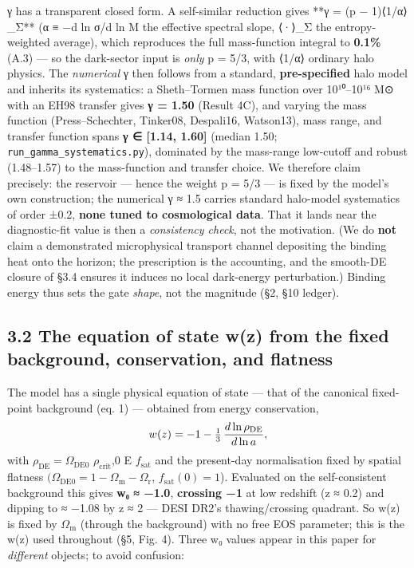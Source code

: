 \documentclass[
  10pt,
]{article}
\begin{document}
γ has a transparent closed form. A self-similar reduction gives **γ = (p
− 1)⟨1/α⟩\_Σ** (α ≡ −d ln σ/d ln M the effective spectral slope, ⟨·⟩\_Σ
the entropy-weighted average), which reproduces the full mass-function
integral to \textbf{0.1\%} (A.3) --- so the dark-sector input is
\emph{only} p = 5/3, with ⟨1/α⟩ ordinary halo physics. The
\emph{numerical} γ then follows from a standard, \textbf{pre-specified}
halo model and inherits its systematics: a Sheth--Tormen mass function
over 10¹⁰--10¹⁶ M⊙ with an EH98 transfer gives \textbf{γ = 1.50} (Result
4C), and varying the mass function (Press--Schechter, Tinker08,
Despali16, Watson13), mass range, and transfer function spans \textbf{γ
∈ {[}1.14, 1.60{]}} (median 1.50; \texttt{run\_gamma\_systematics.py}),
dominated by the mass-range low-cutoff and robust (1.48--1.57) to the
mass-function and transfer choice. We therefore claim precisely: the
reservoir --- hence the weight p = 5/3 --- is fixed by the model's own
construction; the numerical γ ≈ 1.5 carries standard halo-model
systematics of order ±0.2, \textbf{none tuned to cosmological data}.
That it lands near the diagnostic-fit value is then a \emph{consistency
check}, not the motivation. (We do \textbf{not} claim a demonstrated
microphysical transport channel depositing the binding heat onto the
horizon; the prescription is the accounting, and the smooth-DE closure
of §3.4 ensures it induces no local dark-energy perturbation.) Binding
energy thus sets the gate \emph{shape}, not the magnitude (§2, §10
ledger).

\subsection{3.2 The equation of state w(z) from the fixed background,
conservation, and
flatness}\label{the-equation-of-state-wz-from-the-fixed-background-conservation-and-flatness}

The model has a single physical equation of state --- that of the
canonical fixed-point background (eq. 1) --- obtained from energy
conservation,
\[w(z) = -1 - \tfrac13\,\frac{d\ln\rho_{\rm DE}}{d\ln a},\] with
\(\rho _{\mathrm{DE}} = \Omega _{\mathrm{DE0}}\)
\(\rho _{\mathrm{crit}}\),0 E \(f_{\mathrm{sat}}\) and the present-day
normalisation fixed by spatial flatness
\((\Omega _{\mathrm{DE0}} = 1 - \Omega _{\mathrm{m}} - \Omega _{\mathrm{r}}\),
\(f_{\mathrm{sat}}(0) = 1\)). Evaluated on the self-consistent
background this gives \textbf{w₀ ≈ −1.0}, \textbf{crossing −1} at low
redshift (z ≈ 0.2) and dipping to ≈ −1.08 by z ≈ 2 --- DESI DR2's
thawing/crossing quadrant. So w(z) is fixed by \(\Omega _{\mathrm{m}}\)
(through the background) with no free EOS parameter; this is the w(z)
used throughout (§5, Fig. 4). Three w₀ values appear in this paper for
\emph{different} objects; to avoid confusion:
\end{document}
